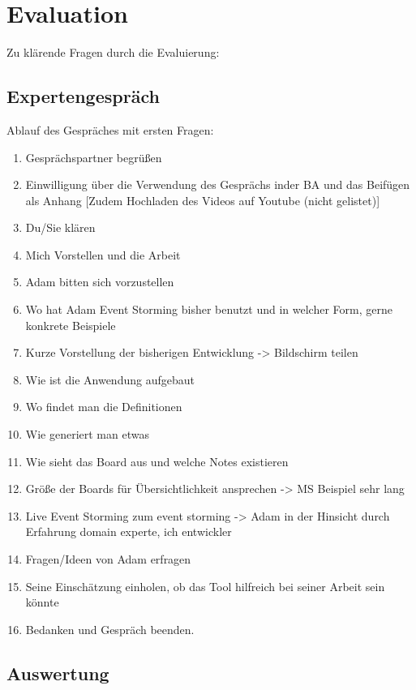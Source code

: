 \chapter{Evaluation}\label{ch:evaluation}
Zu klärende Fragen durch die Evaluierung:






\section{Expertengespräch}\label{sec:expertengespraech}

Ablauf des Gespräches mit ersten Fragen:
\begin{enumerate}
    \item Gesprächspartner begrüßen
    \item Einwilligung über die Verwendung des Gesprächs inder BA und das Beifügen als Anhang [Zudem Hochladen des Videos auf Youtube (nicht gelistet)]
    \item Du/Sie klären
    \item Mich Vorstellen und die Arbeit
    \item Adam bitten sich vorzustellen
    \item Wo hat Adam Event Storming bisher benutzt und in welcher Form, gerne konkrete Beispiele
    \item Kurze Vorstellung der bisherigen Entwicklung -> Bildschirm teilen
    \item Wie ist die Anwendung aufgebaut
    \item Wo findet man die Definitionen
    \item Wie generiert man etwas
    \item Wie sieht das Board aus und welche Notes existieren
    \item Größe der Boards für Übersichtlichkeit ansprechen -> MS Beispiel sehr lang
    \item Live Event Storming zum event storming -> Adam in der Hinsicht durch Erfahrung domain experte, ich entwickler
    \item Fragen/Ideen von Adam erfragen
    \item Seine Einschätzung einholen, ob das Tool hilfreich bei seiner Arbeit sein könnte
    \item Bedanken und Gespräch beenden.
\end{enumerate}

\section{Auswertung}\label{sec:auswertung}
